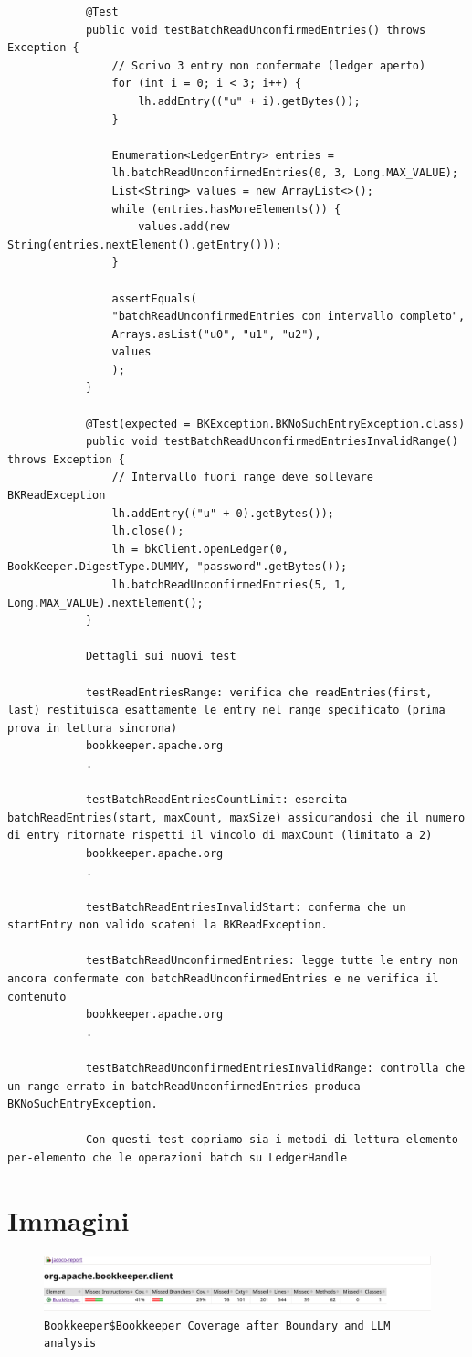 \documentclass[10pt]{article}
\begin{document}
{\begin{verbatim}
			@Test
			public void testBatchReadUnconfirmedEntries() throws Exception {
				// Scrivo 3 entry non confermate (ledger aperto)
				for (int i = 0; i < 3; i++) {
					lh.addEntry(("u" + i).getBytes());
				}
				
				Enumeration<LedgerEntry> entries =
				lh.batchReadUnconfirmedEntries(0, 3, Long.MAX_VALUE);
				List<String> values = new ArrayList<>();
				while (entries.hasMoreElements()) {
					values.add(new String(entries.nextElement().getEntry()));
				}
				
				assertEquals(
				"batchReadUnconfirmedEntries con intervallo completo",
				Arrays.asList("u0", "u1", "u2"),
				values
				);
			}
			
			@Test(expected = BKException.BKNoSuchEntryException.class)
			public void testBatchReadUnconfirmedEntriesInvalidRange() throws Exception {
				// Intervallo fuori range deve sollevare BKReadException
				lh.addEntry(("u" + 0).getBytes());
				lh.close();
				lh = bkClient.openLedger(0, BookKeeper.DigestType.DUMMY, "password".getBytes());
				lh.batchReadUnconfirmedEntries(5, 1, Long.MAX_VALUE).nextElement();
			}
			
			Dettagli sui nuovi test
			
			testReadEntriesRange: verifica che readEntries(first, last) restituisca esattamente le entry nel range specificato (prima prova in lettura sincrona) 
			bookkeeper.apache.org
			.
			
			testBatchReadEntriesCountLimit: esercita batchReadEntries(start, maxCount, maxSize) assicurandosi che il numero di entry ritornate rispetti il vincolo di maxCount (limitato a 2) 
			bookkeeper.apache.org
			.
			
			testBatchReadEntriesInvalidStart: conferma che un startEntry non valido scateni la BKReadException.
			
			testBatchReadUnconfirmedEntries: legge tutte le entry non ancora confermate con batchReadUnconfirmedEntries e ne verifica il contenuto 
			bookkeeper.apache.org
			.
			
			testBatchReadUnconfirmedEntriesInvalidRange: controlla che un range errato in batchReadUnconfirmedEntries produca BKNoSuchEntryException.
			
			Con questi test copriamo sia i metodi di lettura elemento-per-elemento che le operazioni batch su LedgerHandle
		\end{verbatim}
		
		
		\newpage %
		\section{Immagini}
		\begin{figure}
			\centering
			\includegraphics[width=1.0\linewidth, frame]{img/Bookkeeper-before-code-coverage.png}
			\caption{\texttt{Bookkeeper\$Bookkeeper Coverage after Boundary and LLM analysis}}
			\label{fig:BookkeeperCoverage}
		\end{figure}
		
}
\end{document}
